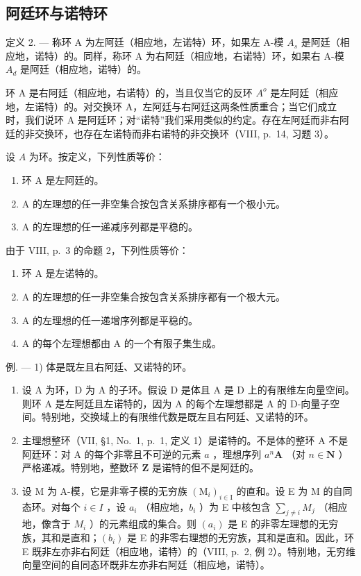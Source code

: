 \subsection{阿廷环与诺特环}

定义 2. --- 称环 A 为左阿廷（相应地，左诺特）环，如果左 A-模 \(A_{s}\) 是阿廷（相应地，诺特）的。同样，称环 A 为右阿廷（相应地，右诺特）环，如果右 A-模 \(A_{d}\) 是阿廷（相应地，诺特）的。

环 A 是右阿廷（相应地，右诺特）的，当且仅当它的反环 \(A^{o}\) 是左阿廷（相应地，左诺特）的。对交换环 A，左阿廷与右阿廷这两条性质重合；当它们成立时，我们说环 A 是阿廷环；对``诺特''我们采用类似的约定。存在左阿廷而非右阿廷的非交换环，也存在左诺特而非右诺特的非交换环（VIII, p.~14, 习题 3）。

设 \(A\) 为环。按定义，下列性质等价：

\begin{enumerate}
\def\labelenumi{(\roman{enumi})}
\item
  环 A 是左阿廷的。
\item
  A 的左理想的任一非空集合按包含关系排序都有一个极小元。
\item
  A 的左理想的任一递减序列都是平稳的。
\end{enumerate}

由于 VIII, p.~3 的命题 2，下列性质等价：

\begin{enumerate}
\def\labelenumi{(\roman{enumi})}
\item
  环 A 是左诺特的。
\item
  A 的左理想的任一非空集合按包含关系排序都有一个极大元。
\item
  A 的左理想的任一递增序列都是平稳的。
\item
  A 的每个左理想都由 A 的一个有限子集生成。
\end{enumerate}

例. --- 1) 体是既左且右阿廷、又诺特的环。

\begin{enumerate}
\def\labelenumi{\arabic{enumi})}
\setcounter{enumi}{1}
\item
  设 A 为环，D 为 A 的子环。假设 D 是体且 A 是 D 上的有限维左向量空间。则环 A 是左阿廷且左诺特的，因为 A 的每个左理想都是 A 的 D-向量子空间。特别地，交换域上的有限维代数是既左且右阿廷、又诺特的环。
\item
  主理想整环（VII, §1, No.~1, p.~1, 定义 1）是诺特的。不是体的整环 A 不是阿廷环：对 A 的每个非零且不可逆的元素 \(a\) ，理想序列 \(a^n\mathbf{A}\) （对 \(n \in \mathbf{N}\) ）严格递减。特别地，整数环 \(\mathbf{Z}\) 是诺特的但不是阿廷的。
\item
  设 M 为 A-模，它是非零子模的无穷族 \((\mathrm{M}_{i})_{i\in\mathrm{I}}\) 的直和。设 E 为 M 的自同态环。对每个 \(i\in I\) ，设 \(a_{i}\) （相应地，\(b_{i}\) ）为 E 中核包含 \(\sum_{j\neq i}M_{j}\) （相应地，像含于 \(M_{i}\) ）的元素组成的集合。则 \((a_{i})\) 是 E 的非零左理想的无穷族，其和是直和；\((b_{i})\) 是 E 的非零右理想的无穷族，其和是直和。因此，环 E 既非左亦非右阿廷（相应地，诺特）的（VIII, p.~2, 例 2）。特别地，无穷维向量空间的自同态环既非左亦非右阿廷（相应地，诺特）。
\end{enumerate}

